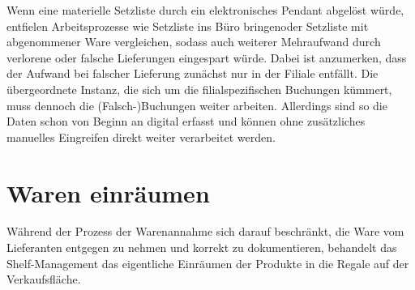 Wenn eine materielle Setzliste durch ein elektronisches Pendant abgelöst würde, entfielen Arbeitsprozesse wie \glqq Setzliste ins Büro bringen\grqq oder \glqq Setzliste mit abgenommener Ware vergleichen\grqq, sodass auch weiterer Mehraufwand durch verlorene oder falsche Lieferungen eingespart würde. Dabei ist anzumerken, dass der Aufwand bei falscher Lieferung zunächst nur in der Filiale entfällt. Die übergeordnete Instanz, die sich um die filialspezifischen Buchungen kümmert, muss dennoch die (Falsch-)Buchungen weiter arbeiten. Allerdings sind so die Daten schon von Beginn an digital erfasst und können ohne zusätzliches manuelles Eingreifen direkt weiter verarbeitet werden.

\section{Waren einräumen}
\label{waren_einräumen}
Während der Prozess der Warenannahme sich darauf beschränkt, die Ware vom Lieferanten entgegen zu nehmen und korrekt zu dokumentieren, behandelt das Shelf-Management das eigentliche Einräumen der Produkte in die Regale auf der Verkaufsfläche.\\

